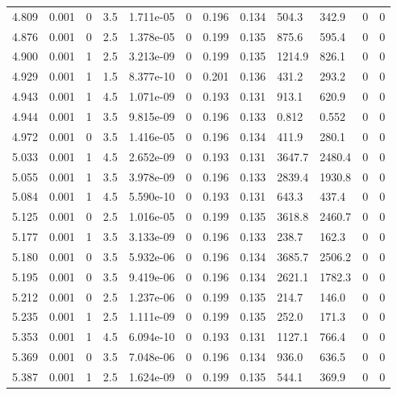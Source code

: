 \documentclass[preview]{standalone}
\begin{document}
{{{{{\begin{tabular}{L{1.2cm}C{1.2cm} C{0.3cm}C{0.5cm} C{1.4cm}C{1.4cm} C{1.4cm}C{1.4cm} C{1.6cm}C{1.6cm} C{1.6cm}C{1.6cm}}
  4.809  &  0.001  & 0     & 3.5 &  1.711e-05  & 0  &  0.196&   0.134& 504.3 & 342.9   &  0 & 0  \\ 
  4.876  &  0.001  & 0     & 2.5 &  1.378e-05  & 0  &  0.199&   0.135& 875.6 & 595.4   &  0 & 0  \\ 
  4.900  &  0.001  & 1     & 2.5 &  3.213e-09  & 0  &  0.199&   0.135& 1214.9 & 826.1   &  0 & 0  \\ 
  4.929  &  0.001  & 1     & 1.5 &  8.377e-10  & 0  &  0.201&   0.136& 431.2 & 293.2   &  0 & 0  \\ 
  4.943  &  0.001  & 1     & 4.5 &  1.071e-09  & 0  &  0.193&   0.131& 913.1 & 620.9   &  0 & 0  \\ 
  4.944  &  0.001  & 1     & 3.5 &  9.815e-09  & 0  &  0.196&   0.133& 0.812 & 0.552   &  0 & 0  \\ 
  4.972  &  0.001  & 0     & 3.5 &  1.416e-05  & 0  &  0.196&   0.134& 411.9 & 280.1   &  0 & 0  \\ 
  5.033  &  0.001  & 1     & 4.5 &  2.652e-09  & 0  &  0.193&   0.131& 3647.7 & 2480.4   &  0 & 0  \\ 
  5.055  &  0.001  & 1     & 3.5 &  3.978e-09  & 0  &  0.196&   0.133& 2839.4 & 1930.8   &  0 & 0  \\ 
  5.084  &  0.001  & 1     & 4.5 &  5.590e-10  & 0  &  0.193&   0.131& 643.3 & 437.4   &  0 & 0  \\ 
  5.125  &  0.001  & 0     & 2.5 &  1.016e-05  & 0  &  0.199&   0.135& 3618.8 & 2460.7   &  0 & 0  \\ 
  5.177  &  0.001  & 1     & 3.5 &  3.133e-09  & 0  &  0.196&   0.133& 238.7 & 162.3   &  0 & 0  \\ 
  5.180  &  0.001  & 0     & 3.5 &  5.932e-06  & 0  &  0.196&   0.134& 3685.7 & 2506.2   &  0 & 0  \\ 
  5.195  &  0.001  & 0     & 3.5 &  9.419e-06  & 0  &  0.196&   0.134& 2621.1 & 1782.3   &  0 & 0  \\ 
  5.212  &  0.001  & 0     & 2.5 &  1.237e-06  & 0  &  0.199&   0.135& 214.7 & 146.0   &  0 & 0  \\ 
  5.235  &  0.001  & 1     & 2.5 &  1.111e-09  & 0  &  0.199&   0.135& 252.0 & 171.3   &  0 & 0  \\ 
  5.353  &  0.001  & 1     & 4.5 &  6.094e-10  & 0  &  0.193&   0.131& 1127.1 & 766.4   &  0 & 0  \\ 
  5.369  &  0.001  & 0     & 3.5 &  7.048e-06  & 0  &  0.196&   0.134& 936.0 & 636.5   &  0 & 0  \\ 
  5.387  &  0.001  & 1     & 2.5 &  1.624e-09  & 0  &  0.199&   0.135& 544.1 & 369.9   &  0 & 0  \\ 

\end{tabular}}}}}}
\end{document}
